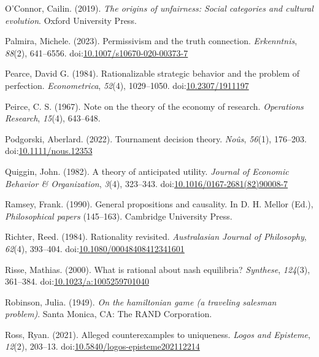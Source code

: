 \documentclass[
  12pt,
  letterpaper,
  DIV=11,
  numbers=noendperiod]{scrreprt}
\newlength{\cslhangindent}
\newenvironment{CSLReferences}[2] %
 {\begin{list}{}{%
  \setlength{\itemindent}{0pt}
  \setlength{\leftmargin}{0pt}
  \setlength{\parsep}{0pt}
  \ifodd #1
   \setlength{\leftmargin}{\cslhangindent}
   \setlength{\itemindent}{-1\cslhangindent}
  \fi
  \setlength{\itemsep}{#2\baselineskip}}}
 {\end{list}}
\begin{document}
\begin{CSLReferences}{1}{0}
O'Connor, Cailin. (2019). \emph{The origins of unfairness: Social
categories and cultural evolution}. {O}xford {U}niversity {P}ress.

Palmira, Michele. (2023). Permissivism and the truth connection.
\emph{Erkenntnis}, \emph{88}(2), 641--6556.
doi:\href{https://doi.org/10.1007/s10670-020-00373-7}{10.1007/s10670-020-00373-7}

Pearce, David G. (1984). Rationalizable strategic behavior and the
problem of perfection. \emph{Econometrica}, \emph{52}(4), 1029--1050.
doi:\href{https://doi.org/10.2307/1911197}{10.2307/1911197}

Peirce, C. S. (1967). Note on the theory of the economy of research.
\emph{Operations Research}, \emph{15}(4), 643--648.

Podgorski, Aberlard. (2022). Tournament decision theory. \emph{No{û}s},
\emph{56}(1), 176--203.
doi:\href{https://doi.org/10.1111/nous.12353}{10.1111/nous.12353}

Quiggin, John. (1982). A theory of anticipated utility. \emph{Journal of
Economic Behavior \& Organization}, \emph{3}(4), 323--343.
doi:\href{https://doi.org/10.1016/0167-2681(82)90008-7}{10.1016/0167-2681(82)90008-7}

Ramsey, Frank. (1990). General propositions and causality. In D. H.
Mellor (Ed.), \emph{Philosophical papers} (145--163). Cambridge
University Press.

Richter, Reed. (1984). Rationality revisited. \emph{Australasian Journal
of Philosophy}, \emph{62}(4), 393--404.
doi:\href{https://doi.org/10.1080/00048408412341601}{10.1080/00048408412341601}

Risse, Mathias. (2000). What is rational about nash equilibria?
\emph{Synthese}, \emph{124}(3), 361--384.
doi:\href{https://doi.org/10.1023/a:1005259701040}{10.1023/a:1005259701040}

Robinson, Julia. (1949). \emph{On the hamiltonian game (a traveling
salesman problem)}. Santa Monica, CA: The RAND Corporation.

Ross, Ryan. (2021). Alleged counterexamples to uniqueness. \emph{Logos
and Episteme}, \emph{12}(2), 203--13.
doi:\href{https://doi.org/10.5840/logos-episteme202112214}{10.5840/logos-episteme202112214}


\end{CSLReferences}
\end{document}
